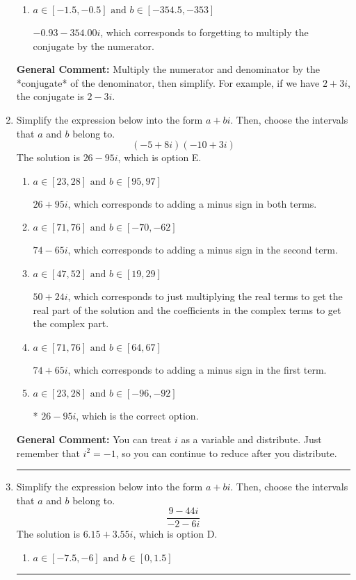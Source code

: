 \documentclass{extbook}[14pt]
\newcommand{\litem}[1]{\item #1

\rule{\textwidth}{0.4pt}}
\begin{document}
\begin{enumerate}
{\begin{enumerate}[label=\Alph*.]
* $-0.93  - 4.85 i$, which is the correct option.
\item \( a \in [-1.5, -0.5] \text{ and } b \in [-354.5, -353] \)

 $-0.93  - 354.00 i$, which corresponds to forgetting to multiply the conjugate by the numerator.
\end{enumerate}

\textbf{General Comment:} Multiply the numerator and denominator by the *conjugate* of the denominator, then simplify. For example, if we have $2+3i$, the conjugate is $2-3i$.
}
\litem{
Simplify the expression below into the form $a+bi$. Then, choose the intervals that $a$ and $b$ belong to.
\[ (-5 + 8 i)(-10 + 3 i) \]The solution is \( 26 - 95 i \), which is option E.\begin{enumerate}[label=\Alph*.]
\item \( a \in [23, 28] \text{ and } b \in [95, 97] \)

 $26 + 95 i$, which corresponds to adding a minus sign in both terms.
\item \( a \in [71, 76] \text{ and } b \in [-70, -62] \)

 $74 - 65 i$, which corresponds to adding a minus sign in the second term.
\item \( a \in [47, 52] \text{ and } b \in [19, 29] \)

 $50 + 24 i$, which corresponds to just multiplying the real terms to get the real part of the solution and the coefficients in the complex terms to get the complex part.
\item \( a \in [71, 76] \text{ and } b \in [64, 67] \)

 $74 + 65 i$, which corresponds to adding a minus sign in the first term.
\item \( a \in [23, 28] \text{ and } b \in [-96, -92] \)

* $26 - 95 i$, which is the correct option.
\end{enumerate}

\textbf{General Comment:} You can treat $i$ as a variable and distribute. Just remember that $i^2=-1$, so you can continue to reduce after you distribute.
}
\litem{
Simplify the expression below into the form $a+bi$. Then, choose the intervals that $a$ and $b$ belong to.
\[ \frac{9 - 44 i}{-2 - 6 i} \]The solution is \( 6.15  + 3.55 i \), which is option D.\begin{enumerate}[label=\Alph*.]
\item \( a \in [-7.5, -6] \text{ and } b \in [0, 1.5] \)


\end{enumerate}}
\end{enumerate}
\end{document}
